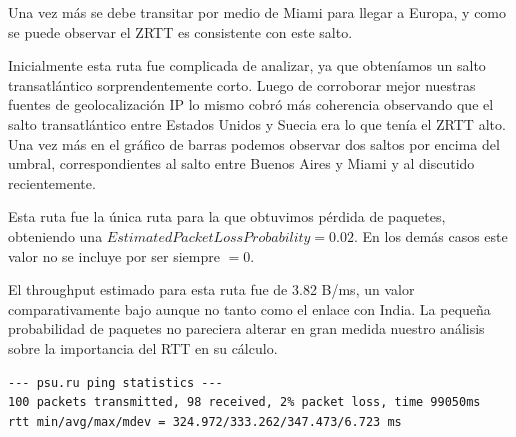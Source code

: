Una vez más se debe transitar por medio de Miami para llegar a Europa, y como se puede observar el ZRTT es consistente con este salto. 

Inicialmente esta ruta fue complicada de analizar, ya que obteníamos un salto transatlántico sorprendentemente corto.
Luego de corroborar mejor nuestras fuentes de geolocalización IP lo mismo cobró más coherencia observando que el salto transatlántico entre Estados Unidos y Suecia era lo que tenía el ZRTT alto. Una vez más en el gráfico de barras podemos observar dos saltos por encima del umbral, correspondientes al salto entre Buenos Aires y Miami y al discutido recientemente.

Esta ruta fue la única ruta para la que obtuvimos pérdida de paquetes, obteniendo una $EstimatedPacketLossProbability = 0.02$. En los demás casos este valor no se incluye por ser siempre $=0$.

El throughput estimado para esta ruta fue de 3.82 B/ms, un valor comparativamente bajo aunque no tanto como el enlace con India. La pequeña probabilidad de paquetes no pareciera alterar en gran medida nuestro análisis sobre la importancia del RTT en su cálculo.

\begin{verbatim}
--- psu.ru ping statistics ---
100 packets transmitted, 98 received, 2% packet loss, time 99050ms
rtt min/avg/max/mdev = 324.972/333.262/347.473/6.723 ms
\end{verbatim}

